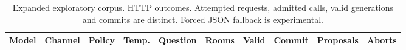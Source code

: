 \begin{table}
\centering
\scriptsize
\caption{Expanded exploratory corpus. HTTP outcomes. Attempted requests, admitted calls, valid generations and commits are distinct. Forced JSON fallback is experimental.}
\begin{tabular}{llllllllll}
\toprule
Model & Channel & Policy & Temp. & Question & Rooms & Valid & Commit & Proposals & Aborts \\
\midrule
\bottomrule
\end{tabular}
\end{table}
